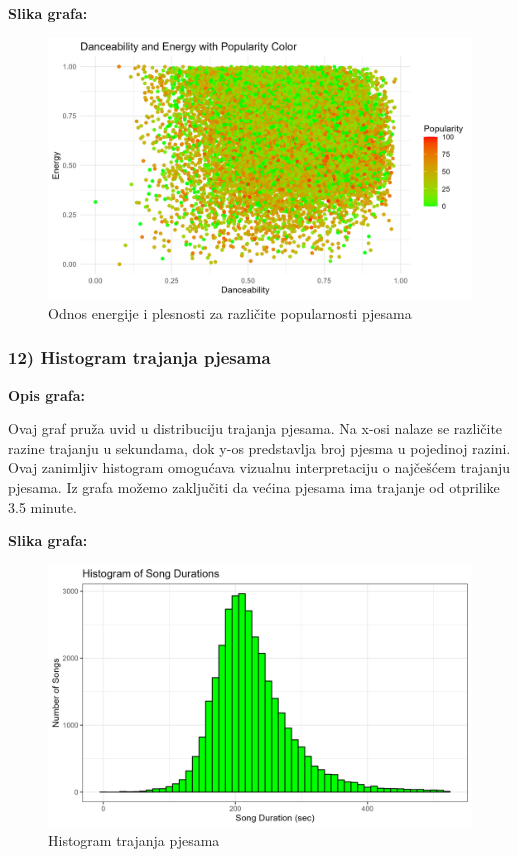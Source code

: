 	\textbf{Slika grafa:}
	\begin{figure}[H]
		\includegraphics[scale=0.9]{slike/Dance-Energy-popularity.png}
		\centering
		\caption{ Odnos energije i plesnosti za različite popularnosti pjesama}
		
	\end{figure}


	\subsubsection{12) Histogram trajanja pjesama}
    
    \textbf{Opis grafa:}
    
Ovaj graf pruža uvid u distribuciju trajanja pjesama. Na x-osi nalaze se različite razine trajanju u sekundama, dok y-os predstavlja broj pjesma u pojedinoj razini. Ovaj zanimljiv histogram omogućava vizualnu interpretaciju o najčešćem trajanju pjesama.
Iz grafa možemo zaključiti da većina pjesama ima trajanje od otprilike 3.5 minute.
    

    \textbf{Slika grafa:}
    \begin{figure}[H]
        \includegraphics[scale=0.9]{slike/Histogram of song durations.png}
        \centering
        \caption{Histogram trajanja pjesama}
        
    \end{figure}
    
